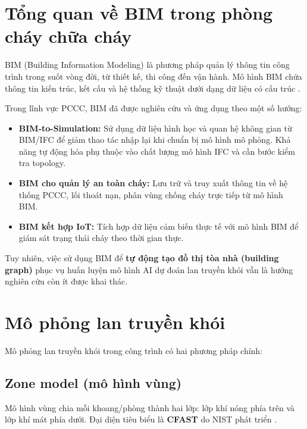 \section{Tổng quan về BIM trong phòng cháy chữa cháy}
\label{sec:bimpccc}

BIM (Building Information Modeling) là phương pháp quản lý thông tin công trình trong suốt vòng đời, từ thiết kế, thi công đến vận hành. Mô hình BIM chứa thông tin kiến trúc, kết cấu và hệ thống kỹ thuật dưới dạng dữ liệu có cấu trúc \cite{eastman2011bim}.

Trong lĩnh vực PCCC, BIM đã được nghiên cứu và ứng dụng theo một số hướng:

\begin{itemize}
  \item \textbf{BIM-to-Simulation:} Sử dụng dữ liệu hình học và quan hệ không gian từ BIM/IFC để giảm thao tác nhập lại khi chuẩn bị mô hình mô phỏng. Khả năng tự động hóa phụ thuộc vào chất lượng mô hình IFC và cần bước kiểm tra topology.
  \item \textbf{BIM cho quản lý an toàn cháy:} Lưu trữ và truy xuất thông tin về hệ thống PCCC, lối thoát nạn, phân vùng chống cháy trực tiếp từ mô hình BIM.
  \item \textbf{BIM kết hợp IoT:} Tích hợp dữ liệu cảm biến thực tế với mô hình BIM để giám sát trạng thái cháy theo thời gian thực.
\end{itemize}

Tuy nhiên, việc sử dụng BIM để \textbf{tự động tạo đồ thị tòa nhà (building graph)} phục vụ huấn luyện mô hình AI dự đoán lan truyền khói vẫn là hướng nghiên cứu còn ít được khai thác.

\section{Mô phỏng lan truyền khói}
\label{sec:mophong}

Mô phỏng lan truyền khói trong công trình có hai phương pháp chính:

\subsection{Zone model (mô hình vùng)}

Mô hình vùng chia mỗi khoang/phòng thành hai lớp: lớp khí nóng phía trên và lớp khí mát phía dưới. Đại diện tiêu biểu là \textbf{CFAST} do NIST phát triển \cite{cfast_guide,cfast_tech}.

